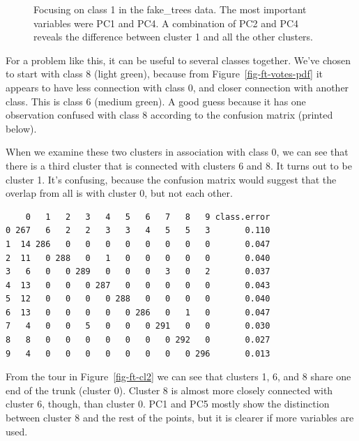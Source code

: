 \documentclass[
  letterpaper,
]{krantz}
\newenvironment{Shaded}{\begin{snugshade}}{\end{snugshade}}
\newcommand{\NormalTok}[1]{\textcolor[rgb]{0.00,0.23,0.31}{#1}}
\newcommand{\SpecialCharTok}[1]{\textcolor[rgb]{0.37,0.37,0.37}{#1}}
\begin{document}
\begin{figure}
\begin{minipage}[t]{0.50\linewidth}
{{}

}

\end{minipage}%

\caption{\label{fig-ft-cl-pdf}Focusing on class 1 in the fake\_trees
data. The most important variables were PC1 and PC4. A combination of
PC2 and PC4 reveals the difference between cluster 1 and all the other
clusters.}

\end{figure}

For a problem like this, it can be useful to several classes together.
We've chosen to start with class 8 (light green), because from
Figure~\ref{fig-ft-votes-pdf} it appears to have less connection with
class 0, and closer connection with another class. This is class 6
(medium green). A good guess because it has one observation confused
with class 8 according to the confusion matrix (printed below).

When we examine these two clusters in association with class 0, we can
see that there is a third cluster that is connected with clusters 6 and
8. It turns out to be cluster 1. It's confusing, because the confusion
matrix would suggest that the overlap from all is with cluster 0, but
not each other.

\begin{Shaded}
\end{Shaded}

\begin{verbatim}
    0   1   2   3   4   5   6   7   8   9 class.error
0 267   6   2   2   3   3   4   5   5   3       0.110
1  14 286   0   0   0   0   0   0   0   0       0.047
2  11   0 288   0   1   0   0   0   0   0       0.040
3   6   0   0 289   0   0   0   3   0   2       0.037
4  13   0   0   0 287   0   0   0   0   0       0.043
5  12   0   0   0   0 288   0   0   0   0       0.040
6  13   0   0   0   0   0 286   0   1   0       0.047
7   4   0   0   5   0   0   0 291   0   0       0.030
8   8   0   0   0   0   0   0   0 292   0       0.027
9   4   0   0   0   0   0   0   0   0 296       0.013
\end{verbatim}

From the tour in Figure~\ref{fig-ft-cl2} we can see that clusters 1, 6,
and 8 share one end of the trunk (cluster 0). Cluster 8 is almost more
closely connected with cluster 6, though, than cluster 0. PC1 and PC5
mostly show the distinction between cluster 8 and the rest of the
points, but it is clearer if more variables are used.
\end{document}
